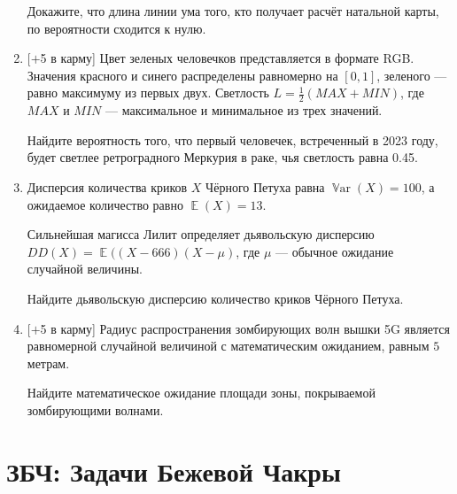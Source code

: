 \documentclass[12pt]{article}
\DeclareMathOperator{\E}{\mathbb{E}}
\DeclareMathOperator{\Var}{\mathbb{V}ar}
\begin{document}
\begin{enumerate}
    Докажите, что  длина линии ума того, кто получает расчёт натальной карты, по вероятности сходится к нулю.
    
    
    \item  $[+$5 в карму] Цвет зеленых человечков представляется в формате RGB. 
    Значения красного и синего распределены равномерно на $[0,1]$, зеленого — равно максимуму из первых двух. Светлость $L = \frac 12 (MAX + MIN)$, где $MAX$ и $MIN$ — максимальное и минимальное из трех значений. 
    
    Найдите вероятность того, что первый человечек, встреченный в 2023 году, будет светлее рет\-рог\-рад\-ного Меркурия в раке, чья светлость равна 0.45.
    
    
    \item  
    Дисперсия количества криков $X$ Чёрного Петуха равна $\Var(X) = 100$, а ожидаемое количество равно $\E(X) = 13$.
    
    Сильнейшая магисса Лилит определяет дьявольскую дисперсию $DD(X) = \E((X - 666) (X-\mu)$, 
    где $\mu$ — обычное ожидание случайной величины. 
    
    Найдите дьявольскую дисперсию количество криков Чёрного Петуха. 
    
    
    
    
    \item  $[+$5 в карму] 
    Радиус распространения зомбирующих волн вышки 5G является равномерной слу\-чай\-ной величиной с математическим ожиданием, равным $5$ метрам. 
    
    Найдите математическое ожидание площади зоны, покрываемой зомбирующими волнами.



    
\end{enumerate}

\newpage

\section*{ЗБЧ: Задачи Бежевой Чакры}
\end{document}
